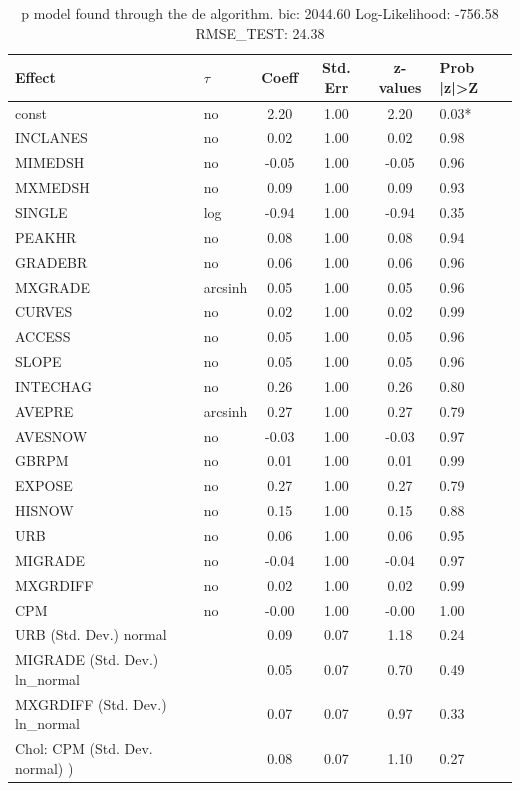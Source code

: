 \begin{table}
	\caption{p model found through the de algorithm. bic: 2044.60 Log-Likelihood: -756.58 RMSE_TEST: 24.38}
	\begin{center}
		\begin{tabular}{|l|l|c|c|c|l|}
			\hline
			Effect & $\tau$ & Coeff & Std. Err & z-values & Prob |z|>Z \\
			\hline
			const & no & 2.20 & 1.00 & 2.20 & 0.03* \\
			\hline
			INCLANES & no & 0.02 & 1.00 & 0.02 & 0.98 \\
			\hline
			MIMEDSH & no & -0.05 & 1.00 & -0.05 & 0.96 \\
			\hline
			MXMEDSH & no & 0.09 & 1.00 & 0.09 & 0.93 \\
			\hline
			SINGLE & log & -0.94 & 1.00 & -0.94 & 0.35 \\
			\hline
			PEAKHR & no & 0.08 & 1.00 & 0.08 & 0.94 \\
			\hline
			GRADEBR & no & 0.06 & 1.00 & 0.06 & 0.96 \\
			\hline
			MXGRADE & arcsinh & 0.05 & 1.00 & 0.05 & 0.96 \\
			\hline
			CURVES & no & 0.02 & 1.00 & 0.02 & 0.99 \\
			\hline
			ACCESS & no & 0.05 & 1.00 & 0.05 & 0.96 \\
			\hline
			SLOPE & no & 0.05 & 1.00 & 0.05 & 0.96 \\
			\hline
			INTECHAG & no & 0.26 & 1.00 & 0.26 & 0.80 \\
			\hline
			AVEPRE & arcsinh & 0.27 & 1.00 & 0.27 & 0.79 \\
			\hline
			AVESNOW & no & -0.03 & 1.00 & -0.03 & 0.97 \\
			\hline
			GBRPM & no & 0.01 & 1.00 & 0.01 & 0.99 \\
			\hline
			EXPOSE & no & 0.27 & 1.00 & 0.27 & 0.79 \\
			\hline
			HISNOW & no & 0.15 & 1.00 & 0.15 & 0.88 \\
			\hline
			URB & no & 0.06 & 1.00 & 0.06 & 0.95 \\
			\hline
			MIGRADE & no & -0.04 & 1.00 & -0.04 & 0.97 \\
			\hline
			MXGRDIFF & no & 0.02 & 1.00 & 0.02 & 0.99 \\
			\hline
			CPM & no & -0.00 & 1.00 & -0.00 & 1.00 \\
			\hline
			URB (Std. Dev.) normal &  & 0.09 & 0.07 & 1.18 & 0.24 \\
			\hline
			MIGRADE (Std. Dev.) ln_normal &  & 0.05 & 0.07 & 0.70 & 0.49 \\
			\hline
			MXGRDIFF (Std. Dev.) ln_normal &  & 0.07 & 0.07 & 0.97 & 0.33 \\
			\hline
			 Chol: CPM (Std. Dev. normal) ) &  & 0.08 & 0.07 & 1.10 & 0.27 \\
			\hline
		\end{tabular}
	\end{center}
\end{table}